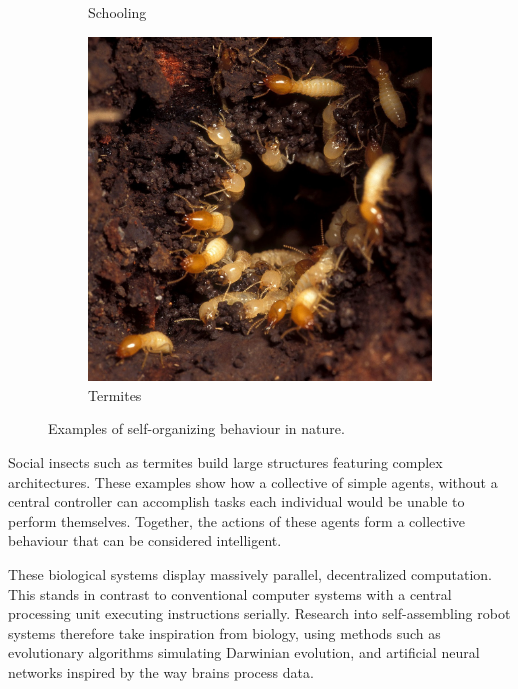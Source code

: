 \begin{figure}[H]
\begin{subfigure}[b]{0.31\textwidth}
		\caption{Schooling\cite{polyglottus_mockingbird-tales-readings--animal-behavior-5.1.pdf_2011}}
	\end{subfigure}
	\begin{subfigure}[b]{0.31\textwidth}
		\label{fig:social-insects}
		\centering
		\includegraphics[height=\linewidth]{chapters/res/Termites_rush_to_damaged_portion_of_mound_edit.jpg}
		\caption{Termites\cite{bauer_termites_rush_to_damaged_portion_of_mound.jpg_2007}}
	\end{subfigure}
	\caption{Examples of self-organizing behaviour in nature.}
	\label{fig:collective-behaviour}
\end{figure}

Social insects such as termites build large structures featuring complex architectures.
These examples show how a collective of simple agents, without a central controller can accomplish tasks each individual would be unable to perform themselves. 
Together, the actions of these agents form a collective behaviour that can be considered intelligent.  

These biological systems display massively parallel, decentralized computation.
This stands in contrast to conventional computer systems with a central processing unit executing instructions serially.
Research into self-assembling robot systems therefore take inspiration from biology, using methods such as evolutionary algorithms simulating Darwinian evolution, and artificial neural networks inspired by the way brains process data.




